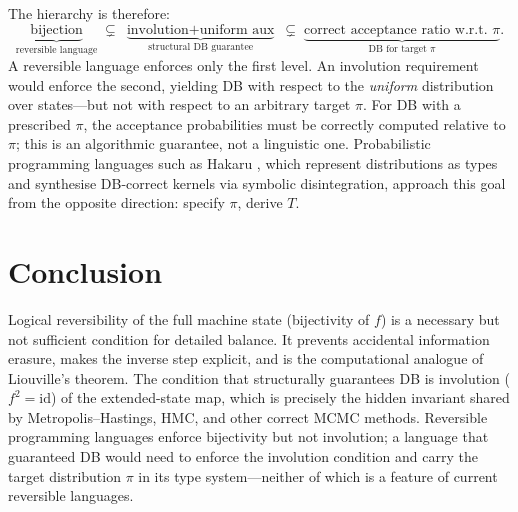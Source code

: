 \documentclass[11pt,a4paper]{article}
\begin{document}
The hierarchy is therefore:
\[
  \underbrace{\text{bijection}}_{\text{reversible language}} \;\subsetneq\;
  \underbrace{\text{involution} + \text{uniform aux}}_{\text{structural DB guarantee}} \;\subsetneq\;
  \underbrace{\text{correct acceptance ratio w.r.t.\ }\pi}_{\text{DB for target }\pi}.
\]
A reversible language enforces only the first level.  An involution requirement would enforce the
second, yielding DB with respect to the \emph{uniform} distribution over states---but not with
respect to an arbitrary target $\pi$.  For DB with a prescribed $\pi$, the acceptance
probabilities must be correctly computed relative to $\pi$; this is an algorithmic guarantee,
not a linguistic one.  Probabilistic programming languages such as Hakaru \cite{narayanan2016},
which represent distributions as types and synthesise DB-correct kernels via symbolic
disintegration, approach this goal from the opposite direction: specify $\pi$, derive $T$.

\section*{Conclusion}

Logical reversibility of the full machine state (bijectivity of $f$) is a necessary but not
sufficient condition for detailed balance.  It prevents accidental information erasure, makes the
inverse step explicit, and is the computational analogue of Liouville's theorem.  The condition
that structurally guarantees DB is involution ($f^2=\mathrm{id}$) of the extended-state map,
which is precisely the hidden invariant shared by Metropolis--Hastings, HMC, and other correct
MCMC methods.  Reversible programming languages enforce bijectivity but not involution; a language
that guaranteed DB would need to enforce the involution condition and carry the target distribution
$\pi$ in its type system---neither of which is a feature of current reversible languages.
\end{document}
